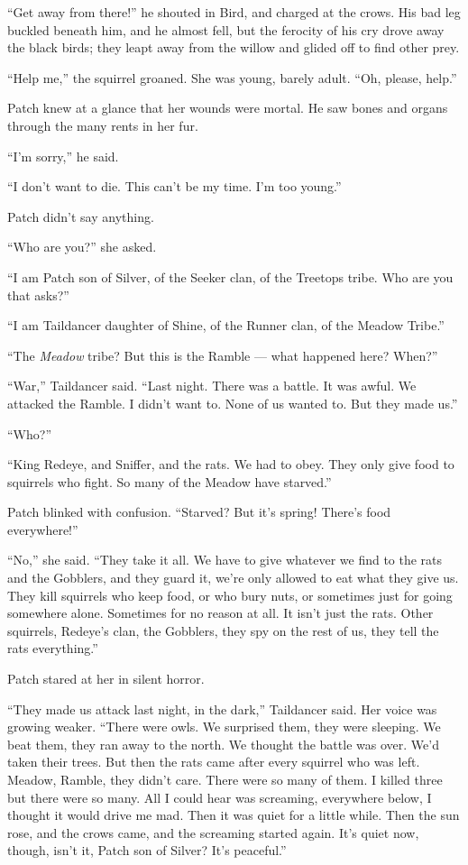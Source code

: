 \documentclass[ebook,oneside,openany,12pt]{memoir}
\begin{document}
“Get away from there!” he shouted in Bird, and charged at the
crows. His bad leg buckled beneath him, and he almost fell, but the
ferocity of his cry drove away the black birds; they leapt away from
the willow and glided off to find other prey.

“Help me,” the squirrel groaned. She was young, barely adult. “Oh,
please, help.”

Patch knew at a glance that her wounds were mortal. He saw bones and
organs through the many rents in her fur.

“I’m sorry,” he said.

“I don’t want to die. This can’t be my time. I’m too young.”

Patch didn’t say anything.

“Who are you?” she asked.

“I am Patch son of Silver, of the Seeker clan, of the Treetops
tribe. Who are you that asks?”

“I am Taildancer daughter of Shine, of the Runner clan, of the Meadow
Tribe.”

“The \emph{Meadow} tribe? But this is the Ramble — what happened
here? When?”

“War,” Taildancer said. “Last night. There was a battle. It was
awful. We attacked the Ramble. I didn’t want to. None of us wanted
to. But they made us.”

“Who?”

“King Redeye, and Sniffer, and the rats. We had to obey. They only
give food to squirrels who fight. So many of the Meadow have starved.”

Patch blinked with confusion. “Starved? But it’s spring! There’s food
everywhere!”

“No,” she said. “They take it all. We have to give whatever we find to
the rats and the Gobblers, and they guard it, we’re only allowed to
eat what they give us. They kill squirrels who keep food, or who bury
nuts, or sometimes just for going somewhere alone. Sometimes for no
reason at all. It isn’t just the rats. Other squirrels, Redeye’s clan,
the Gobblers, they spy on the rest of us, they tell the rats
everything.”

Patch stared at her in silent horror.

“They made us attack last night, in the dark,” Taildancer said. Her
voice was growing weaker. “There were owls. We surprised them, they
were sleeping. We beat them, they ran away to the north. We thought
the battle was over. We’d taken their trees. But then the rats came
after every squirrel who was left. Meadow, Ramble, they didn’t
care. There were so many of them. I killed three but there were so
many. All I could hear was screaming, everywhere below, I thought it
would drive me mad. Then it was quiet for a little while. Then the sun
rose, and the crows came, and the screaming started again. It’s quiet
now, though, isn’t it, Patch son of Silver? It’s peaceful.”
\end{document}
